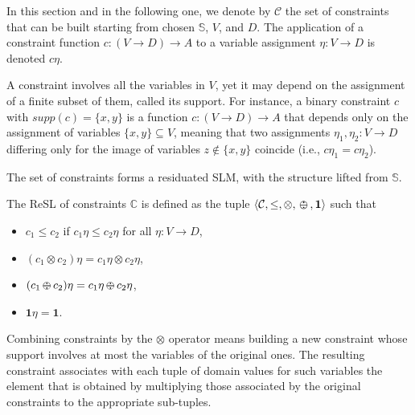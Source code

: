 \documentclass{llncs}
\def\monid{{\mathbf 0}}
\def\monop{\otimes}
\def\odiv{\, {\ominus\hspace{-7.7pt} \div} \,}
\def\monid{\mathbf{1}}
\begin{document}
In this section and in the following one, we denote by $\mathcal{C}$ the set of constraints that can be
built starting from chosen $\mathbb S$, $V$, and $D$. The application of a
constraint function $c:(V \rightarrow D) \rightarrow A$ to a variable
assignment $\eta:V\rightarrow D$ is denoted $c\eta$.  

A constraint involves all the variables in $V$, yet it may depend on
the assignment of a finite subset of them, called its support. For
instance, a binary constraint $c$ with $supp(c)=\{x,y\}$ is a function
$c: (V\rightarrow D)\rightarrow A$ that depends only on the
assignment of variables $\{x,y\}\subseteq V$, meaning that two
assignments $\eta_1, \eta_2: V \rightarrow D$ differing only for the
image of variables $z \not \in \{x,y\}$ coincide (i.e., $c\eta_1 =
c\eta_2$).
%

\smallskip
The set of constraints forms a residuated SLM, with the structure
lifted from ${\mathbb S}$.

\begin{lemma}\label{prop:soft}
	The ReSL of constraints $\mathbb C$ is
	defined as the tuple $\langle {\mathcal C}, \leq, \monop, \odiv, \monid \rangle$ such that
	
	\begin{itemize}
		\item $c_1 \leq c_2$ if $c_1\eta\leq c_2\eta$ for all $\eta: V \rightarrow D$,
		\item $(c_1\monop c_2)\eta = c_1\eta\monop c_2\eta$, %
		\item $(c_1\odiv c_2)\eta = c_1\eta\odiv c_2\eta$, %
		\item $\monid \eta = \monid$.
	\end{itemize}
\end{lemma}


Combining constraints by the $\monop$ operator
means building a new constraint whose support involves at most
the variables of the original ones. The resulting constraint  associates with
each tuple of domain values for such variables the element
that is obtained by multiplying  those associated by the
original constraints to the appropriate sub-tuples.
\end{document}
